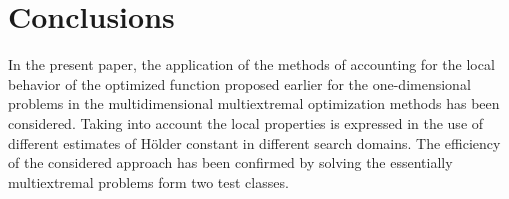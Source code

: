 \documentclass[procedia]{easychair}
\begin{document}
\section{Conclusions}
In the present paper, the application of the methods of accounting for the local
behavior of the optimized function proposed earlier for the one-dimensional problems
in the multidimensional multiextremal optimization methods has been considered. Taking
into account the local properties is expressed in the use of different estimates of Hölder
constant in different search domains. The efficiency of the considered approach has been
confirmed by solving the essentially multiextremal problems form two test classes.



%
\label{sect:bib}
%
%

%



\end{document}
